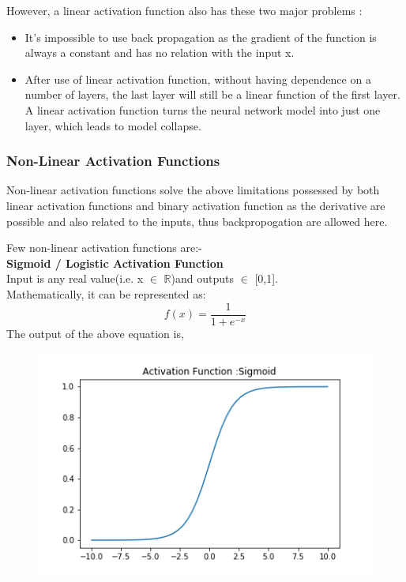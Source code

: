 However, a linear activation function also has these two major problems :

\begin{itemize}
    \item It’s impossible to use back propagation as the gradient of the function is always a constant and has no relation with the input x.
    \item After use of linear activation function, without having dependence on a number of layers, the last layer will still be a linear function of the first layer. A linear activation function turns the neural network model into just one layer, which leads to model collapse.
\end{itemize}

 
\subsubsection{Non-Linear Activation Functions}

Non-linear activation functions solve the above limitations possessed by both linear activation functions and binary activation function as the derivative are possible and also related to the inputs, thus backpropogation are allowed here.

Few non-linear activation functions are:-\\
\textbf{Sigmoid / Logistic Activation Function}\\
Input is any real value(i.e. x $\in$ $\mathbb{R}$)and outputs $\in$ [0,1].\\
Mathematically, it can be represented as:\\
\begin{equation}
    f(x) = \frac{1}{1+e^{-x}}
\end{equation}
The output of the above equation is,
\begin{figure}[H]
    \centering
    \includegraphics{Figure/sigmoid.png}
    \label{fig:my_label}
\end{figure}

